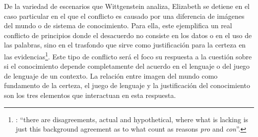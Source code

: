 
De la variedad de escenarios que Wittgenstein analiza, Elizabeth se detiene en el caso particular en el que el conflicto es causado por una diferencia de imágenes del mundo o de sistema de conocimiento. Para ella, este ejemplifica un real conflicto de principios donde el desacuerdo no consiste en los datos o en el uso de las palabras, sino en el trasfondo que sirve como justificación para la certeza en las evidencias\footnote{\cite[Cf.][222]{teichmann2008ans}: \enquote{there are disagreements, actual and hypothetical, where what is lacking is just this background agreement as to what count as reasons \emph{pro} and \emph{con}}.}. Este tipo de conflicto será el foco su respuesta a la cuestión sobre si el conocimiento depende completamente del acuerdo en el lenguaje o del juego de lenguaje de un contexto. La relación entre imagen del mundo como fundamento de la certeza, el juego de lenguaje y la justificación del conocimiento son los tres elementos que interactuan en esta respuesta.

